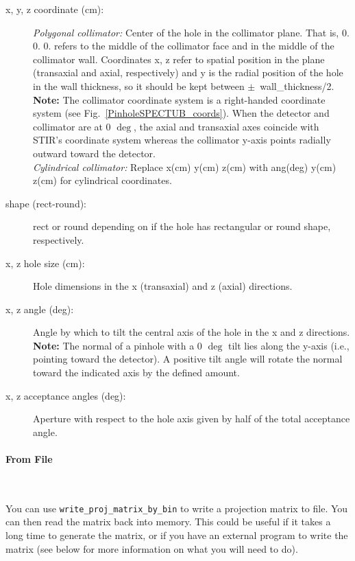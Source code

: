 \documentclass{article}
\newcommand{\subsubsubsection}[1]{\paragraph{#1}\mbox{} \\}
\begin{document}
{{{{{{\begin{description}
\begin{description}
\item[x, y, z coordinate (cm):] \textit{Polygonal collimator:} Center of the hole in the collimator plane. That is, 0. 0. 0. refers to the middle of the collimator face and in the middle of the collimator wall. Coordinates x, z refer to spatial position in the plane (transaxial and axial, respectively) and y is the radial position of the hole in the wall thickness, so it should be kept between $\pm$~wall\_thickness/2. \textbf{Note:} The collimator coordinate system is a right-handed coordinate system (see Fig.~\ref{PinholeSPECTUB_coords}). When the detector and collimator are at 0 $\mathrm{\deg}$, the axial and transaxial axes coincide with STIR's coordinate system whereas the collimator y-axis points radially outward toward the detector. \\ \textit{Cylindrical collimator:} Replace x(cm) y(cm) z(cm) with ang(deg) y(cm) z(cm) for cylindrical coordinates. 

\item[shape (rect-round):] rect or round depending on if the hole has rectangular or round shape, respectively.

\item[x, z hole size (cm):] Hole dimensions in the x (transaxial) and z (axial) directions.

\item[x, z angle (deg):] Angle by which to tilt the central axis of the hole in the x and z directions. \textbf{Note:} The normal of a pinhole with a 0 $\mathrm{\deg}$ tilt lies along the y-axis (i.e., pointing toward the detector). A positive tilt angle will rotate the normal toward the indicated axis by the defined amount.

\item[x, z acceptance angles (deg):] Aperture with respect to the hole axis given by half of the total acceptance angle.

\end{description}
\end{description}


{ \subsubsubsection{From File} }
\label{sec:projmatrixfromfile}
You can use \texttt{write\_proj\_matrix\_by\_bin} to write a projection matrix to file. You can
then read the matrix back into memory. This
could be useful if it takes a long time to generate the matrix, or if you have an external program
to write the matrix (see below for more information on what you will need to do).


}}}}}}
\end{document}
